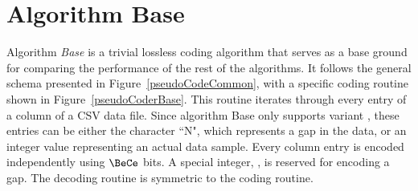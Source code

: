 

\section{Algorithm Base}
\label{algo:base}
\newcommand{\codeColumn}{$\text{code\_column}$}
\newcommand{\decodeColumn}{$\text{decode\_column}$}

\vspace{-5pt}
Algorithm \textit{Base} is a trivial lossless coding algorithm that serves as a base ground for comparing the performance of the rest of the algorithms. It follows the general schema presented in Figure~\ref{pseudoCodeCommon}, with a specific coding routine shown in Figure~\ref{pseudoCoderBase}. This routine iterates through every entry of a column of a CSV data file. Since algorithm Base only supports variant \NOmaskalgo, these entries can be either the character ``N", which represents a gap in the data, or an integer value representing an actual data sample. Every column entry is encoded independently using $\BeCe$ bits. A special integer, \nodata, is reserved for encoding a gap. The decoding routine is symmetric to the coding routine.






